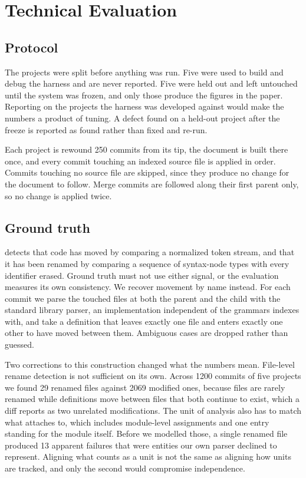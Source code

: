\section{Technical Evaluation}
\label{app:attachment}

\subsection{Protocol}

The projects were split before anything was run. Five were used to build and debug the harness and are never reported. Five were held out and left untouched until the system was frozen, and only those produce the figures in the paper. Reporting on the projects the harness was developed against would make the numbers a product of tuning. A defect found on a held-out project after the freeze is reported as found rather than fixed and re-run.

Each project is rewound 250 commits from its tip, the document is built there once, and every commit touching an indexed source file is applied in order. Commits touching no source file are skipped, since they produce no change for the document to follow. Merge commits are followed along their first parent only, so no change is applied twice.

\subsection{Ground truth}
\label{app:attachment-truth}

\sys{} detects that code has moved by comparing a normalized token stream, and that it has been renamed by comparing a sequence of syntax-node types with every identifier erased. Ground truth must not use either signal, or the evaluation measures its own consistency. We recover movement by name instead. For each commit we parse the touched files at both the parent and the child with the standard library parser, an implementation independent of the grammars \sys{} indexes with, and take a definition that leaves exactly one file and enters exactly one other to have moved between them. Ambiguous cases are dropped rather than guessed.

Two corrections to this construction changed what the numbers mean. File-level rename detection is not sufficient on its own. Across 1200 commits of five projects we found 29 renamed files against 2069 modified ones, because files are rarely renamed while definitions move between files that both continue to exist, which a diff reports as two unrelated modifications. The unit of analysis also has to match what \sys{} attaches to, which includes module-level assignments and one entry standing for the module itself. Before we modelled those, a single renamed file produced 13 apparent failures that were entities our own parser declined to represent. Aligning what counts as a unit is not the same as aligning how units are tracked, and only the second would compromise independence.


